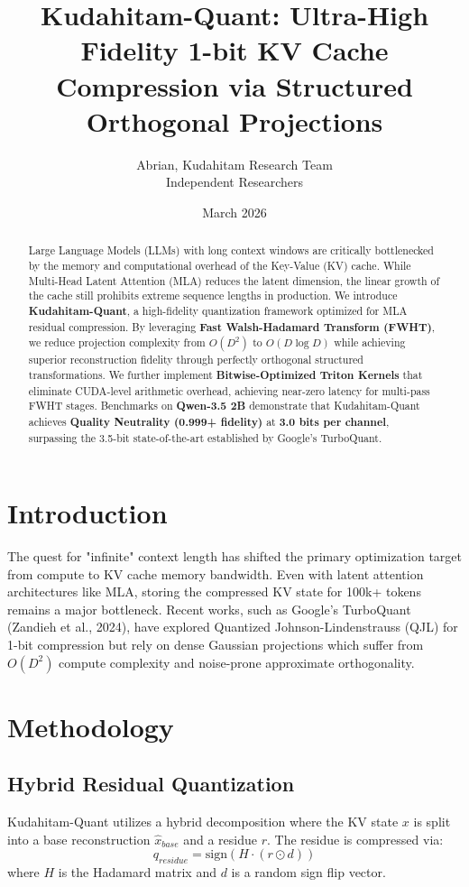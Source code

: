 \documentclass[twocolumn]{article}
\title{\textbf{Kudahitam-Quant: Ultra-High Fidelity 1-bit KV Cache Compression via Structured Orthogonal Projections}}
\author{Abrian, Kudahitam Research Team \\ \small{Independent Researchers}}
\date{March 2026}
\begin{document}
\maketitle

\begin{abstract}
Large Language Models (LLMs) with long context windows are critically bottlenecked by the memory and computational overhead of the Key-Value (KV) cache. While Multi-Head Latent Attention (MLA) reduces the latent dimension, the linear growth of the cache still prohibits extreme sequence lengths in production. We introduce \textbf{Kudahitam-Quant}, a high-fidelity quantization framework optimized for MLA residual compression. By leveraging \textbf{Fast Walsh-Hadamard Transform (FWHT)}, we reduce projection complexity from $O(D^2)$ to \textbf{$O(D \log D)$} while achieving superior reconstruction fidelity through perfectly orthogonal structured transformations. We further implement \textbf{Bitwise-Optimized Triton Kernels} that eliminate CUDA-level arithmetic overhead, achieving near-zero latency for multi-pass FWHT stages. Benchmarks on \textbf{Qwen-3.5 2B} demonstrate that Kudahitam-Quant achieves \textbf{Quality Neutrality (0.999+ fidelity)} at \textbf{3.0 bits per channel}, surpassing the 3.5-bit state-of-the-art established by Google's TurboQuant.
\end{abstract}

\section{Introduction}
The quest for "infinite" context length has shifted the primary optimization target from compute to KV cache memory bandwidth. Even with latent attention architectures like MLA, storing the compressed KV state for 100k+ tokens remains a major bottleneck. Recent works, such as Google's TurboQuant (Zandieh et al., 2024), have explored Quantized Johnson-Lindenstrauss (QJL) for 1-bit compression but rely on dense Gaussian projections which suffer from $O(D^2)$ compute complexity and noise-prone approximate orthogonality.

\section{Methodology}
\subsection{Hybrid Residual Quantization}
Kudahitam-Quant utilizes a hybrid decomposition where the KV state $x$ is split into a base reconstruction $\hat{x}_{base}$ and a residue $r$. The residue is compressed via:
\begin{equation}
q_{residue} = \text{sign}(H \cdot (r \odot d))
\end{equation}
where $H$ is the Hadamard matrix and $d$ is a random sign flip vector.
\end{document}
